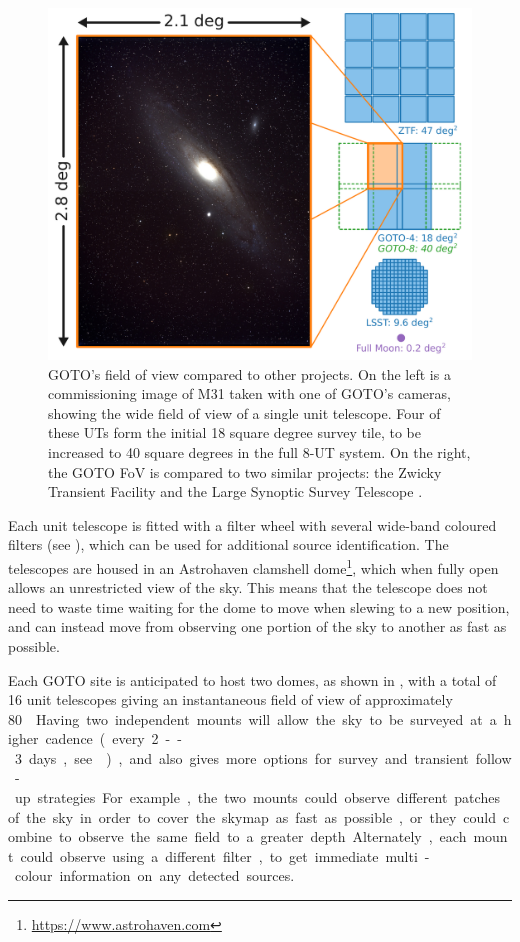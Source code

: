 \begin{colsection}
\begin{figure}[p]
    \begin{center}
        \includegraphics[width=\linewidth]{images/fov.pdf}
    \end{center}
    \caption[GOTO's field of view compared to other projects]{
        GOTO's field of view compared to other projects. On the left is a commissioning image of M31 taken with one of GOTO's cameras, showing the wide field of view of a single unit telescope. Four of these UTs form the initial 18 square degree survey tile, to be increased to 40 square degrees in the full 8-UT system. On the right, the GOTO FoV is compared to two similar projects: the Zwicky Transient Facility  \citep[ZTF,][]{ZTF} and the Large Synoptic Survey Telescope  \citep[LSST,][]{LSST}.
    }\label{fig:fov}
\end{figure}

Each unit telescope is fitted with a filter wheel with several wide-band coloured filters (see ), which can be used for additional source identification. The telescopes are housed in an Astrohaven clamshell dome\footnote{\url{https://www.astrohaven.com}}, which when fully open allows an unrestricted view of the sky. This means that the telescope does not need to waste time waiting for the dome to move when slewing to a new position, and can instead move from observing one portion of the sky to another as fast as possible.

Each GOTO site is anticipated to host two domes, as shown in , with a total of 16 unit telescopes giving an instantaneous field of view of approximately \SI{80}{\square\deg}. Having two independent mounts will allow the sky to be surveyed at a higher cadence (every 2--3 days, see ), and also gives more options for survey and transient follow-up strategies. For example, the two mounts could observe different patches of the sky in order to cover the skymap as fast as possible, or they could combine to observe the same field to a greater depth. Alternately, each mount could observe using a different filter, to get immediate multi-colour information on any detected sources.


\end{colsection}
